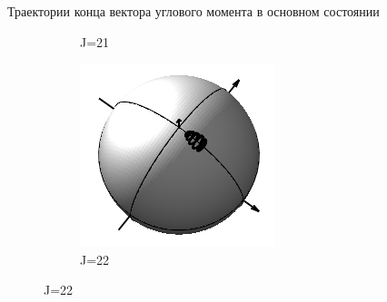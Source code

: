 \documentclass[hyperref={pdfpagelabels=false},usepdftitle=false, xcolor = dvipsnames]{beamer}
\begin{document}
\begin{frame}{Траектории конца вектора углового момента в основном состоянии}
\begin{block}{}
\begin{figure}
\begin{subfigure}{0.3\textwidth}
     \caption{J=21}
  \end{subfigure}
  \begin{subfigure}{0.3\textwidth}
    \includegraphics[width = \linewidth]{../pictures/rigid_base/plot_J=22n=0.png}
    \caption{J=22}
  \end{subfigure}
\end{figure}
\end{block}
\end{frame}
\end{document}
